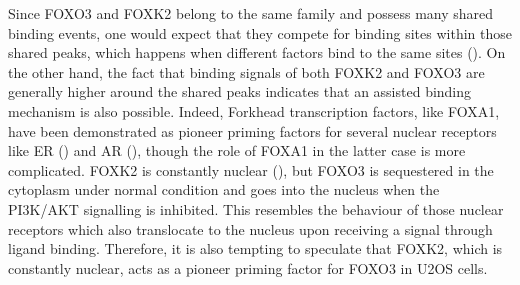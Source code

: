 Since FOXO3 and FOXK2 belong to the same family and possess many shared binding events, one would expect that they compete for binding sites within those shared peaks, which happens when different factors bind to the same sites (\cite{pierce2003sum1,zhou2011integrated}). On the other hand, the fact that binding signals of both FOXK2 and FOXO3 are generally higher around the shared peaks indicates that an assisted binding mechanism is also possible. Indeed, Forkhead transcription factors, like FOXA1, have been demonstrated as pioneer priming factors for several nuclear receptors like ER (\cite{hurtado2011foxa1}) and AR (\cite{wang2011reprogramming}), though the role of FOXA1 in the latter case is more complicated. FOXK2 is constantly nuclear (\cite{marais2010cell}), but FOXO3 is sequestered in the cytoplasm under normal condition and goes into the nucleus when the PI3K/AKT signalling is inhibited. This resembles the behaviour of those nuclear receptors which also translocate to the nucleus upon receiving a signal through ligand binding. Therefore, it is also tempting to speculate that FOXK2, which is constantly nuclear, acts as a pioneer priming factor for FOXO3 in U2OS cells.


